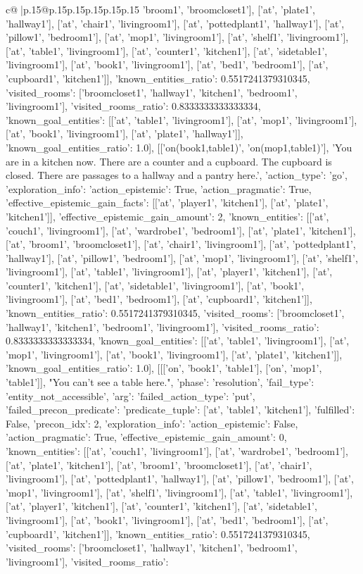 \documentclass{article}
\begin{document}
{\begin{supertabular}{c@{$\;$}|p{.15\linewidth}@{}p{.15\linewidth}p{.15\linewidth}p{.15\linewidth}p{.15\linewidth}p{.15\linewidth}}
{{{'broom1', 'broomcloset1'], ['at', 'plate1', 'hallway1'], ['at', 'chair1', 'livingroom1'], ['at', 'pottedplant1', 'hallway1'], ['at', 'pillow1', 'bedroom1'], ['at', 'mop1', 'livingroom1'], ['at', 'shelf1', 'livingroom1'], ['at', 'table1', 'livingroom1'], ['at', 'counter1', 'kitchen1'], ['at', 'sidetable1', 'livingroom1'], ['at', 'book1', 'livingroom1'], ['at', 'bed1', 'bedroom1'], ['at', 'cupboard1', 'kitchen1']], 'known_entities_ratio': 0.5517241379310345, 'visited_rooms': ['broomcloset1', 'hallway1', 'kitchen1', 'bedroom1', 'livingroom1'], 'visited_rooms_ratio': 0.8333333333333334, 'known_goal_entities': [['at', 'table1', 'livingroom1'], ['at', 'mop1', 'livingroom1'], ['at', 'book1', 'livingroom1'], ['at', 'plate1', 'hallway1']], 'known_goal_entities_ratio': 1.0}}], [['on(book1,table1)', 'on(mop1,table1)'], 'You are in a kitchen now. There are a counter and a cupboard. The cupboard is closed. There are passages to a hallway and a pantry here.', {'action_type': 'go', 'exploration_info': {'action_epistemic': True, 'action_pragmatic': True, 'effective_epistemic_gain_facts': [['at', 'player1', 'kitchen1'], ['at', 'plate1', 'kitchen1']], 'effective_epistemic_gain_amount': 2, 'known_entities': [['at', 'couch1', 'livingroom1'], ['at', 'wardrobe1', 'bedroom1'], ['at', 'plate1', 'kitchen1'], ['at', 'broom1', 'broomcloset1'], ['at', 'chair1', 'livingroom1'], ['at', 'pottedplant1', 'hallway1'], ['at', 'pillow1', 'bedroom1'], ['at', 'mop1', 'livingroom1'], ['at', 'shelf1', 'livingroom1'], ['at', 'table1', 'livingroom1'], ['at', 'player1', 'kitchen1'], ['at', 'counter1', 'kitchen1'], ['at', 'sidetable1', 'livingroom1'], ['at', 'book1', 'livingroom1'], ['at', 'bed1', 'bedroom1'], ['at', 'cupboard1', 'kitchen1']], 'known_entities_ratio': 0.5517241379310345, 'visited_rooms': ['broomcloset1', 'hallway1', 'kitchen1', 'bedroom1', 'livingroom1'], 'visited_rooms_ratio': 0.8333333333333334, 'known_goal_entities': [['at', 'table1', 'livingroom1'], ['at', 'mop1', 'livingroom1'], ['at', 'book1', 'livingroom1'], ['at', 'plate1', 'kitchen1']], 'known_goal_entities_ratio': 1.0}}], [[['on', 'book1', 'table1'], ['on', 'mop1', 'table1']], "You can't see a table here.", {'phase': 'resolution', 'fail_type': 'entity_not_accessible', 'arg': {'failed_action_type': 'put', 'failed_precon_predicate': {'predicate_tuple': ['at', 'table1', 'kitchen1'], 'fulfilled': False, 'precon_idx': 2}}, 'exploration_info': {'action_epistemic': False, 'action_pragmatic': True, 'effective_epistemic_gain_amount': 0, 'known_entities': [['at', 'couch1', 'livingroom1'], ['at', 'wardrobe1', 'bedroom1'], ['at', 'plate1', 'kitchen1'], ['at', 'broom1', 'broomcloset1'], ['at', 'chair1', 'livingroom1'], ['at', 'pottedplant1', 'hallway1'], ['at', 'pillow1', 'bedroom1'], ['at', 'mop1', 'livingroom1'], ['at', 'shelf1', 'livingroom1'], ['at', 'table1', 'livingroom1'], ['at', 'player1', 'kitchen1'], ['at', 'counter1', 'kitchen1'], ['at', 'sidetable1', 'livingroom1'], ['at', 'book1', 'livingroom1'], ['at', 'bed1', 'bedroom1'], ['at', 'cupboard1', 'kitchen1']], 'known_entities_ratio': 0.5517241379310345, 'visited_rooms': ['broomcloset1', 'hallway1', 'kitchen1', 'bedroom1', 'livingroom1'], 'visited_rooms_ratio': }}}
\end{supertabular}}
\end{document}

